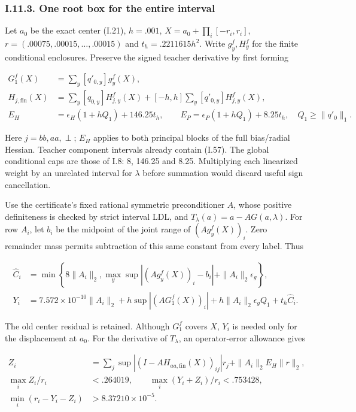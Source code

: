 \documentclass{article}
\begin{document}
\subsubsection*{I.11.3. One root box for the entire
interval}\label{i.11.3.-one-root-box-for-the-entire-interval}

Let \(a_0\) be the exact center (I.21), \(h=.001\),
\(X=a_0+\prod_i[-r_i,r_i]\), \(r=(.00075,.00015,\ldots,.00015)\) and
\(t_h=.2211615h^2\). Write \(g_y^f,H_y^f\) for the finite conditional
enclosures. Preserve the signed teacher derivative by first forming

\[
\begin{aligned}
G_1^f(X)&=\sum_y[q'_{0,y}]g_y^f(X),\\
H_{j,\mathrm{fin}}(X)&=\sum_y[q_{0,y}]H_{j,y}^f(X)
+[-h,h]\sum_y[q'_{0,y}]H_{j,y}^f(X),\\
E_H&=\epsilon_H(1+hQ_1)+146.25t_h,\qquad
E_P=\epsilon_P(1+hQ_1)+8.25t_h,\quad Q_1\ge\|q'_0\|_1.
\end{aligned}
\tag{I.60}
\]

Here \(j=bb,aa,\perp\); \(E_H\) applies to both principal blocks of the
full bias/radial Hessian. Teacher component intervals already contain
(I.57). The global conditional caps are those of I.8: 8, 146.25 and
8.25. Multiplying each linearized weight by an unrelated interval for
\(\lambda\) before summation would discard useful sign cancellation.

Use the certificate's fixed rational symmetric preconditioner \(A\),
whose positive definiteness is checked by strict interval LDL, and
\(T_\lambda(a)=a-AG(a,\lambda)\). For row \(A_i\), let \(b_i\) be the
midpoint of the joint range of \((Ag_y^f(X))_i\). Zero remainder mass
permits subtraction of this same constant from every label. Thus

\[
\begin{aligned}
\widehat C_i&=\min\left\{8\|A_i\|_2,
\max_y\sup|(Ag_y^f(X))_i-b_i|+\|A_i\|_2\epsilon_g\right\},\\
Y_i&=7.572\times10^{-10}\|A_i\|_2
+h\sup|(AG_1^f(X))_i|
+h\|A_i\|_2\epsilon_gQ_1+t_h\widehat C_i.
\end{aligned}
\tag{I.61}
\]

The old center residual is retained. Although \(G_1^f\) covers \(X\),
\(Y_i\) is needed only for the displacement at \(a_0\). For the
derivative of \(T_\lambda\), an operator-error allowance gives

\[
\begin{aligned}
Z_i&=\sum_j\sup|(I-AH_{aa,\mathrm{fin}}(X))_{ij}|r_j
+\|A_i\|_2E_H\|r\|_2,\\
\max_i Z_i/r_i&<.264019,\qquad
\max_i(Y_i+Z_i)/r_i<.753428,\\
\min_i(r_i-Y_i-Z_i)&>8.37210\times10^{-5}.
\end{aligned}
\tag{I.62}
\]
\end{document}
